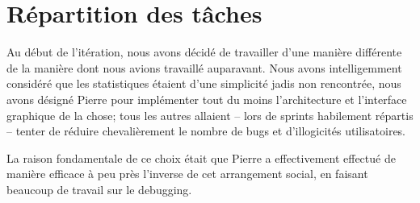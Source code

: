 \section{Répartition des tâches}

Au début de l'itération, nous avons décidé de travailler d'une manière différente
de la manière dont nous avions travaillé auparavant. Nous avons intelligemment
considéré que les statistiques étaient d'une simplicité jadis non rencontrée,
nous avons désigné Pierre pour implémenter tout du moins l'architecture et 
l'interface graphique de la chose; tous les autres allaient -- lors de sprints
habilement répartis -- tenter de réduire chevalièrement le nombre de bugs et 
d'illogicités utilisatoires.

La raison fondamentale de ce choix était que Pierre a effectivement effectué 
de manière efficace à peu près l'inverse de cet arrangement social, en faisant
beaucoup de travail sur le debugging.